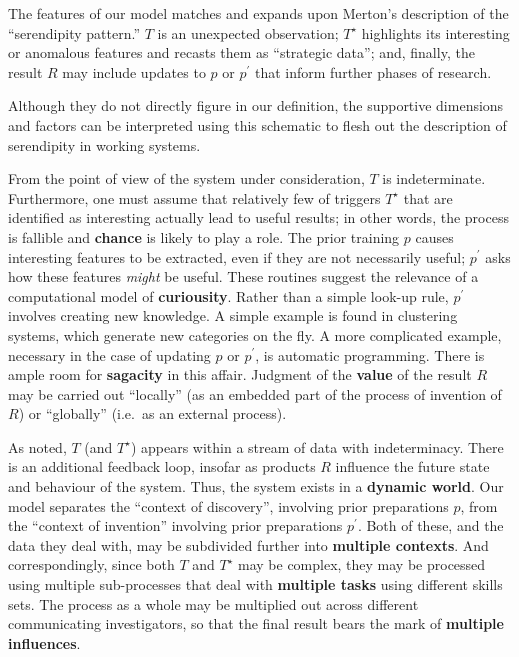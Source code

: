 The features of our model matches and expands upon Merton's \citeyear{merton1948bearing} description of the ``serendipity pattern.'' $T$ is an unexpected observation; $T^\star$ highlights its interesting or anomalous features and recasts them as ``strategic data''; and, finally, the result $R$ may include updates to $p$ or $p^{\prime}$ that inform further phases of research.  

Although they do not directly figure in our definition, the supportive
dimensions and factors can be interpreted using this schematic to
flesh out the description of serendipity in working systems.

From the point of view of the system under consideration, $T$ is
indeterminate.  Furthermore, one must assume that relatively few of
triggers $T^\star$ that are identified as interesting actually lead to
useful results; in other words, the process is fallible and
\textbf{chance} is likely to play a role.
%
The prior training $p$ causes interesting features
to be extracted, even if they are not necessarily useful; $p^{\prime}$
asks how these features \emph{might} be useful.  These routines 
suggest the relevance of a computational model of \textbf{curiousity}.
%
Rather than a simple look-up rule, $p^{\prime}$ involves creating new knowledge.  A simple example is found in clustering systems, which generate new categories on the fly.  A more complicated example, necessary in the case of updating $p$ or $p^{\prime}$, is automatic programming.  There is ample room for \textbf{sagacity} in this affair.
%
Judgment of the \textbf{value} of the result $R$ may be carried out
``locally'' (as an embedded part of the process of invention of $R$)
or ``globally'' (i.e.~as an external process).

As noted, $T$ (and $T^\star$) appears within a stream of data with
indeterminacy.  There is an additional feedback loop, insofar as
products $R$ influence the future state and behaviour of the system.
Thus, the system exists in a \textbf{dynamic world}.
%
Our model separates the
``context of discovery'', involving prior preparations $p$, from the
``context of invention'' involving prior preparations $p^{\prime}$.
Both of these, and the data they deal with, may be subdivided further into \textbf{multiple contexts}. 
%
And correspondingly, since both $T$ and $T^\star$ may be complex, they
may be processed using multiple sub-processes that deal with
\textbf{multiple tasks} using different skills sets.
%
The process as a whole may be multiplied out across different
communicating investigators, so that the final result bears the mark
of \textbf{multiple influences}.




